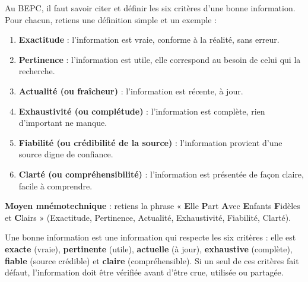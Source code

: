 \documentclass[11pt]{article}
\newcommand{\cle}[1]{{\popxbold\color{popdark}#1}}
\begin{document}
\begin{methode}
Au BEPC, il faut savoir citer et définir les \cle{six critères d'une bonne information}. Pour chacun, retiens une définition simple et un exemple :
\begin{enumerate}
\item \textbf{Exactitude} : l'information est vraie, conforme à la réalité, sans erreur.
\item \textbf{Pertinence} : l'information est utile, elle correspond au besoin de celui qui la recherche.
\item \textbf{Actualité (ou fraîcheur)} : l'information est récente, à jour.
\item \textbf{Exhaustivité (ou complétude)} : l'information est complète, rien d'important ne manque.
\item \textbf{Fiabilité (ou crédibilité de la source)} : l'information provient d'une source digne de confiance.
\item \textbf{Clarté (ou compréhensibilité)} : l'information est présentée de façon claire, facile à comprendre.
\end{enumerate}
\textbf{Moyen mnémotechnique} : retiens la phrase « \textbf{E}lle \textbf{P}art \textbf{A}vec \textbf{E}nfants \textbf{F}idèles et \textbf{C}lairs » (Exactitude, Pertinence, Actualité, Exhaustivité, Fiabilité, Clarté).
\end{methode}

\begin{aretenir}
Une \cle{bonne information} est une information qui respecte les six critères : elle est \textbf{exacte} (vraie), \textbf{pertinente} (utile), \textbf{actuelle} (à jour), \textbf{exhaustive} (complète), \textbf{fiable} (source crédible) et \textbf{claire} (compréhensible). Si un seul de ces critères fait défaut, l'information doit être vérifiée avant d'être crue, utilisée ou partagée.
\end{aretenir}
\end{document}

